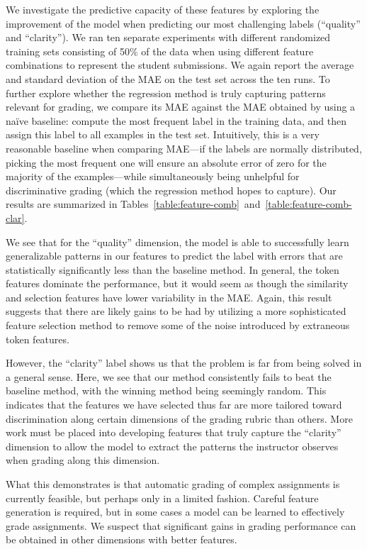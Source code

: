 We investigate the predictive capacity of these features by exploring the
improvement of the model when predicting our most challenging labels
(``quality'' and ``clarity''). We ran ten separate experiments with
different randomized training sets consisting of 50\% of the data when
using different feature combinations to represent the student submissions.
We again report the average and standard deviation of the MAE on the test
set across the ten runs. To further explore whether the regression method
is truly capturing patterns relevant for grading, we compare its MAE
against the MAE obtained by using a na\"ive baseline: compute the most
frequent label in the training data, and then assign this label to all
examples in the test set.  Intuitively, this is a very reasonable baseline
when comparing MAE---if the labels are normally distributed, picking the
most frequent one will ensure an absolute error of zero for the majority of
the examples---while simultaneously being unhelpful for discriminative
grading (which the regression method hopes to capture). Our results are
summarized in
Tables~\ref{table:feature-comb}~and~\ref{table:feature-comb-clar}.


We see that for the ``quality'' dimension, the model is able to
successfully learn generalizable patterns in our features to predict the
label with errors that are statistically significantly less than the
baseline method. In general, the token features dominate the performance,
but it would seem as though the similarity and selection features have
lower variability in the MAE. Again, this result suggests that there are
likely gains to be had by utilizing a more sophisticated feature selection
method to remove some of the noise introduced by extraneous token features.

However, the ``clarity'' label shows us that the problem is far from being
solved in a general sense. Here, we see that our method consistently fails
to beat the baseline method, with the winning method being seemingly
random. This indicates that the features we have selected thus far are more
tailored toward discrimination along certain dimensions of the grading
rubric than others. More work must be placed into developing features that
truly capture the ``clarity'' dimension to allow the model to extract the
patterns the instructor observes when grading along this dimension.



What this demonstrates is that automatic grading of complex assignments is
currently feasible, but perhaps only in a limited fashion. Careful feature
generation is required, but in some cases a model can be learned to
effectively grade assignments. We suspect that significant gains in
grading performance can be obtained in other dimensions with better
features.
